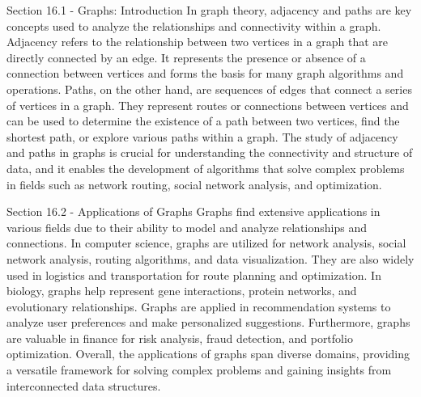 \begin{notes}{Section 16.1 - Graphs: Introduction}
    In graph theory, adjacency and paths are key concepts used to analyze the relationships and connectivity within a graph. Adjacency refers to the relationship between two vertices in a graph that are 
    directly connected by an edge. It represents the presence or absence of a connection between vertices and forms the basis for many graph algorithms and operations. Paths, on the other hand, are sequences 
    of edges that connect a series of vertices in a graph. They represent routes or connections between vertices and can be used to determine the existence of a path between two vertices, find the shortest 
    path, or explore various paths within a graph. The study of adjacency and paths in graphs is crucial for understanding the connectivity and structure of data, and it enables the development of algorithms 
    that solve complex problems in fields such as network routing, social network analysis, and optimization.
\end{notes}

\begin{notes}{Section 16.2 - Applications of Graphs}
    Graphs find extensive applications in various fields due to their ability to model and analyze relationships and connections. In computer science, graphs are utilized for network analysis, social network 
    analysis, routing algorithms, and data visualization. They are also widely used in logistics and transportation for route planning and optimization. In biology, graphs help represent gene interactions, 
    protein networks, and evolutionary relationships. Graphs are applied in recommendation systems to analyze user preferences and make personalized suggestions. Furthermore, graphs are valuable in finance 
    for risk analysis, fraud detection, and portfolio optimization. Overall, the applications of graphs span diverse domains, providing a versatile framework for solving complex problems and gaining insights 
    from interconnected data structures.
\end{notes}

